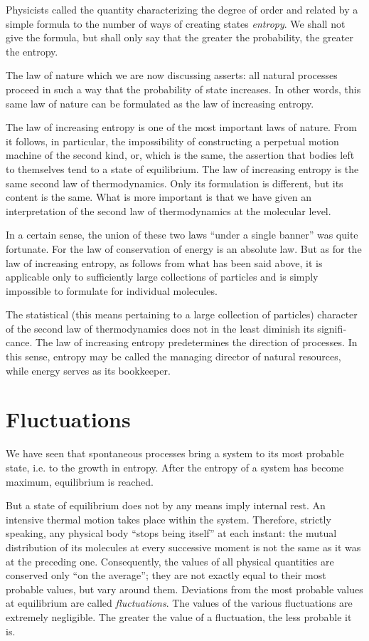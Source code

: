 Physicists called the quantity characterizing the degree of order and related by a simple formula to the number of ways of creating states \emph{entropy}. We shall not give the for­mula, but shall only say that the greater the probability, the greater the entropy.

The law of nature which we are now discussing asserts: all natural processes proceed in such a way that the probability of state increases. In other words, this same law of nature can be formulated as the law of increasing entropy.

The law of increasing entropy is one of the most im­portant laws of nature. From it follows, in particular, the impossibility of constructing a perpetual motion machine of the second kind, or, which is the same, the assertion that bodies left to themselves tend to a state of equilibrium. The law of increasing entropy is the same second law of thermodynamics. Only its formulation is different, but its content is the same. What is more important is that we have given an interpretation of the second law of thermodynamics at the molecular level.

In a certain sense, the union of these two laws ``under a single banner'' was quite fortunate. For the law of con­servation of energy is an absolute law. But as for the law of increasing entropy, as follows from what has been said above, it is applicable only to sufficiently large collections of particles and is simply impossible to formulate for individual molecules.

The statistical (this means pertaining to a large col­lection of particles) character of the second law of ther­modynamics does not in the least diminish its signifi­cance. The law of increasing entropy predetermines the di­rection of processes. In this sense, entropy may be called the managing director of natural resources, while energy serves as its bookkeeper.

\section{Fluctuations}
We have seen that spontaneous processes bring a sys­tem to its most probable state, i.e. to the growth in en­tropy. After the entropy of a system has become maximum, equilibrium is reached.

But a state of equilibrium does not by any means im­ply internal rest. An intensive thermal motion takes place within the system. Therefore, strictly speaking, any physical body ``stops being itself'' at each instant: the mutual distribution of its molecules at every succes­sive moment is not the same as it was at the preceding one. Consequently, the values of all physical quantities are conserved only ``on the average''; they are not exactly equal to their most probable values, but vary around them. Deviations from the most probable values at equi­librium are called \emph{fluctuations}. The values of the various fluctuations are extremely negligible. The greater the value of a fluctuation, the less probable it is.


